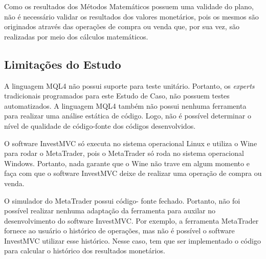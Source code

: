 Como os resultados dos Métodos Matemáticos possuem uma validade do plano, não é necessário validar os resultados dos valores monetários, pois os mesmos são originados através das operações de compra ou venda que, por sua vez, são realizadas por meio dos cálculos matemáticos.

\subsection{Limitações do Estudo}

A linguagem MQL4 não possui suporte para teste unitário. Portanto, os \textit{experts} tradicionais programados para este Estudo de Caso, não possuem testes automatizados. A linguagem MQL4 também não possui nenhuma ferramenta para realizar uma análise estática de código. Logo, não é possível determinar o nível de qualidade de código-fonte dos códigos desenvolvidos.

O software InvestMVC só executa no sistema operacional Linux e utiliza o Wine para rodar o MetaTrader, pois o MetaTrader só roda no sistema operacional Windows. Portanto, nada garante que o Wine não trave em algum momento e faça com que o software InvestMVC deixe de realizar uma operação de compra ou venda.

O simulador do MetaTrader possui código- fonte fechado. Portanto, não foi possível realizar nenhuma adaptação da ferramenta para auxilar no desenvolvimento do software InvestMVC. Por exemplo, a ferramenta MetaTrader fornece ao usuário o histórico de operações, mas não é possível o software InvestMVC utilizar esse histórico. Nesse caso, tem que ser implementado o código para calcular o histórico dos resultados monetários.